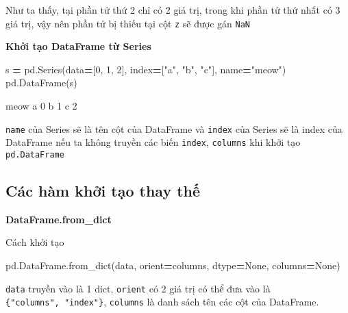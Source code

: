 \documentclass[
]{book}
\newenvironment{Shaded}{\begin{snugshade}}{\end{snugshade}}
\newcommand{\DecValTok}[1]{\textcolor[rgb]{0.00,0.00,0.81}{#1}}
\newcommand{\NormalTok}[1]{#1}
\newcommand{\OperatorTok}[1]{\textcolor[rgb]{0.81,0.36,0.00}{\textbf{#1}}}
\newcommand{\StringTok}[1]{\textcolor[rgb]{0.31,0.60,0.02}{#1}}
\newcommand{\VariableTok}[1]{\textcolor[rgb]{0.00,0.00,0.00}{#1}}
\begin{document}
Như ta thấy, tại phần tử thứ 2 chỉ có 2 giá trị, trong khi phần tử thứ nhất có 3 giá trị, vậy nên phần tử bị thiếu tại cột \texttt{z} sẽ được gán \texttt{NaN}

\textbf{Khởi tạo DataFrame từ Series}

\begin{Shaded}
\begin{Highlighting}[]
\NormalTok{s }\OperatorTok{=}\NormalTok{ pd.Series(data}\OperatorTok{=}\NormalTok{[}\DecValTok{0}\NormalTok{, }\DecValTok{1}\NormalTok{, }\DecValTok{2}\NormalTok{], index}\OperatorTok{=}\NormalTok{[}\StringTok{"a"}\NormalTok{, }\StringTok{"b"}\NormalTok{, }\StringTok{"c"}\NormalTok{], name}\OperatorTok{=}\StringTok{"meow"}\NormalTok{)}
\NormalTok{pd.DataFrame(s)}
\end{Highlighting}
\end{Shaded}

\begin{Shaded}
\begin{Highlighting}[]
\NormalTok{   meow}
\NormalTok{a     0}
\NormalTok{b     1}
\NormalTok{c     2}
\end{Highlighting}
\end{Shaded}

\texttt{name} của Series sẽ là tên cột của DataFrame và \texttt{index} của Series sẽ là index của DataFrame nếu ta không truyền các biến \texttt{index}, \texttt{columns} khi khởi tạo \texttt{pd.DataFrame}

\subsection{Các hàm khởi tạo thay thế}\label{cuxe1c-huxe0m-khux1edfi-tux1ea1o-thay-thux1ebf}

\textbf{DataFrame.from\_dict}

Cách khởi tạo

\begin{Shaded}
\begin{Highlighting}[]
\NormalTok{pd.DataFrame.from\_dict(data, orient}\OperatorTok{=}\StringTok{\textquotesingle{}columns\textquotesingle{}}\NormalTok{, dtype}\OperatorTok{=}\VariableTok{None}\NormalTok{, columns}\OperatorTok{=}\VariableTok{None}\NormalTok{)}
\end{Highlighting}
\end{Shaded}

\texttt{data} truyền vào là 1 dict, \texttt{orient} có 2 giá trị có thể đưa vào là \texttt{\{"columns",\ "index"\}}, \texttt{columns} là danh sách tên các cột của DataFrame.
\end{document}
